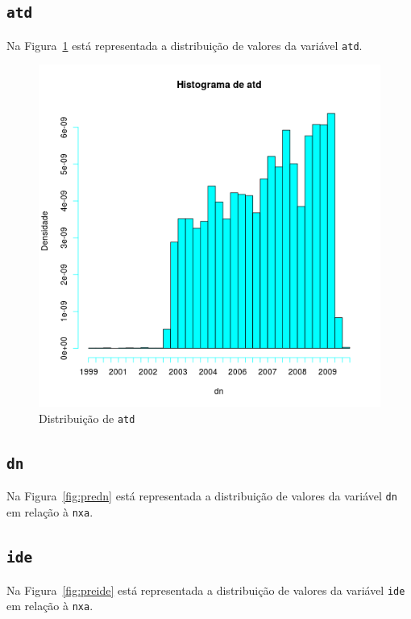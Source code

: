 \documentclass[10pt, conference, compsocconf]{IEEEtran}
\begin{document}
\subsection{\texttt{atd}}
Na Figura~\ref{fig:preatd} está representada a distribuição de valores
da variável {\tt atd}.

\begin{figure}[H]
  \centering
  \includegraphics[scale=0.4]{img/pre_atd.png}
  \caption{Distribuição de {\tt atd}}
  \label{fig:preatd}
\end{figure}

\subsection{\texttt{dn}}
Na Figura~\ref{fig:predn} está representada a distribuição de valores
da variável {\tt dn} em relação à {\tt nxa}.


\subsection{\texttt{ide}}
Na Figura~\ref{fig:preide} está representada a distribuição de valores
da variável {\tt ide} em relação à {\tt nxa}.

\end{document}
